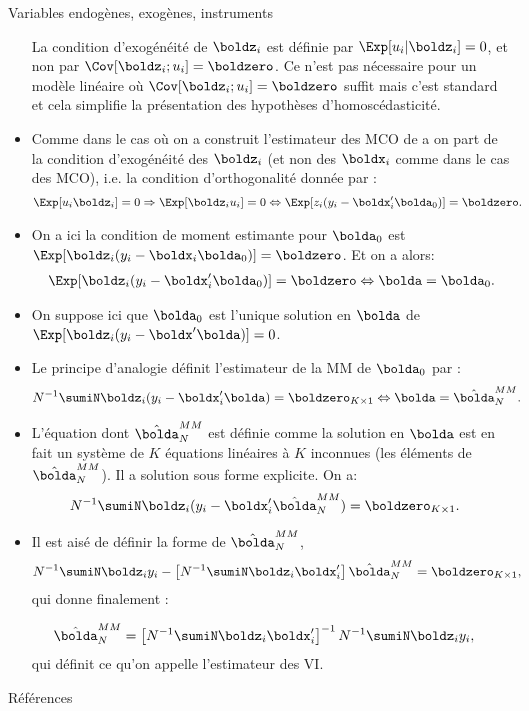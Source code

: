 \begin{frame}[allowframebreaks]{Variables endogènes, exogènes, instruments}
\begin{itemize}
\begin{remark_fr}
    La condition d’exogénéité de $\boldz_i$ est définie par $\Exp[u_i|\boldz_i]= 0$, et non par 
    $\Cov[\boldz_i ;u_i ]= \boldzero$.
    Ce n’est pas nécessaire pour un modèle linéaire où $\Cov[\boldz_i ;u_i ]= \boldzero$ suffit
    mais c’est standard et cela simplifie la présentation des hypothèses d’homoscédasticité.
\end{remark_fr}

\framebreak

\item Comme dans le cas où on a construit l’estimateur des MCO de a
on part de la condition d’exogénéité des $\boldz_i$ (et non des $\boldx_i$ comme dans le cas
des MCO), i.e. la condition d’orthogonalité donnée par :
\begin{align*}
    \Exp[u_i\boldz_i]=0 &\Rightarrow \Exp[\boldz_iu_i]=0 \Leftrightarrow 
    \Exp[z_i(y_i-\boldx_i^\prime\bolda_0)]=\boldzero.
\end{align*}
\item On a ici la condition de moment estimante pour $\bolda_0$ est $\Exp[\boldz_i(y_i -\boldx_i\bolda_0)]= \boldzero$. 
Et on a alors:
\begin{align*}
     \Exp[\boldz_i(y_i-\boldx_i^\prime \bolda_0)] = \boldzero \Leftrightarrow \bolda = \bolda_0.
\end{align*}
\item On suppose ici que $\bolda_0$ est l’unique solution en $\bolda$ de $\Exp[\boldz_i(y_i-\boldx^\prime\bolda)]= 0$. 
\item Le principe d’analogie définit l’estimateur de la MM de $\bolda_0$ par :
\begin{align*}
    N^{-1}\sumiN \boldz_i(y_i-\boldx_i^\prime\bolda)=\boldzero_{K\times 1} &\Leftrightarrow \bolda = \hat{\bolda}_N^{MM}.
\end{align*}

\item  L’équation dont $\hat{\bolda}_N^{MM}$ est définie comme la solution en $\bolda$ est en fait un système
de $K$ équations linéaires à $K$ inconnues (les éléments de  $\hat{\bolda}_N^{MM}$). 
Il a solution sous forme explicite. On a:
\begin{align*}
    N^{-1}\sumiN \boldz_i(y_i-\boldx_i^\prime\hat{\bolda}_N^{MM})&=\boldzero_{K\times 1}.
\end{align*}
\item Il est aisé de définir la forme de $\hat{\bolda}_N^{MM}$,
\begin{align*}
N^{-1}\sumiN \boldz_iy_i - \left[N^{-1}\sumiN \boldz_i\boldx_i^\prime \right]\hat{\bolda}_N^{MM}&=\boldzero_{K\times 1},
\end{align*}
qui donne finalement :

\begin{align*}
    \hat{\bolda}_N^{MM} &= \left[N^{-1}\sumiN \boldz_i\boldx_i^\prime \right]^{-1}N^{-1}\sumiN \boldz_iy_i,
\end{align*}
qui définit ce qu’on appelle l’estimateur des VI.
\end{itemize}
\end{frame}
\begin{frame}[allowframebreaks]{Références}

 
  \end{frame}



    
    